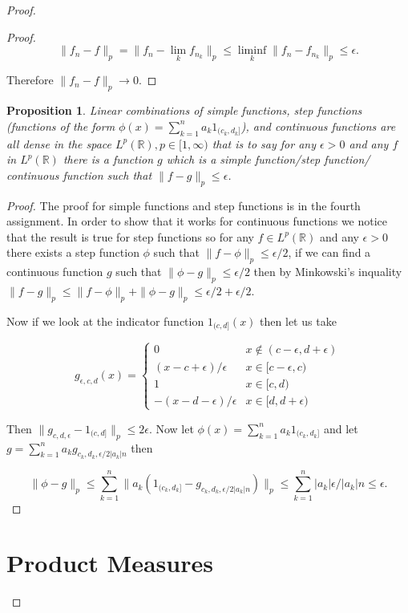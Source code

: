 \documentclass[
]{book}
\newtheorem{proposition}{Proposition}[chapter]
\theoremstyle{definition}
\theoremstyle{definition}
\theoremstyle{definition}
\theoremstyle{definition}
\theoremstyle{remark}
\begin{document}
\begin{proof}
\begin{proof}
\[ \|f_n -f\|_p = \|f_n - \lim_k f_{n_k}\|_p \leq \liminf_k \|f_n - f_{n_k}\|_p \leq \epsilon. \]

Therefore \(\|f_n - f\|_p \rightarrow 0.\)
\end{proof}

\begin{proposition}
Linear combinations of simple functions, step functions (functions of the form \(\phi(x) = \sum_{k=1}^n a_k 1_{(c_k,d_k]}\)), and continuous functions are all dense in the space \(L^p(\mathbb{R}), p \in [1,\infty)\) that is to say for any \(\epsilon > 0\) and any \(f\) in \(L^p(\mathbb{R})\) there is a function \(g\) which is a simple function/step function/ continuous function such that \(\|f-g\|_p \leq \epsilon\).
\end{proposition}

\begin{proof}
The proof for simple functions and step functions is in the fourth assignment. In order to show that it works for continuous functions we notice that the result is true for step functions so for any \(f \in L^p(\mathbb{R})\) and any \(\epsilon >0\) there exists a step function \(\phi\) such that \(\| f-\phi\|_p \leq \epsilon/2\), if we can find a continuous function \(g\) such that \(\|\phi-g\|_p \leq \epsilon/2\) then by Minkowski's inquality \(\|f-g\|_p \leq \|f-\phi\|_p + \|\phi - g\|_p \leq \epsilon/2 + \epsilon/2\).

Now if we look at the indicator function \(1_{(c,d]}(x)\) then let us take

\[ g_{\epsilon, c,d}(x) = \left\{ \begin{array}{ll} 0 & x \notin (c-\epsilon, d+\epsilon) \\ (x-c+ \epsilon)/\epsilon & x \in [c-\epsilon, c) \\ 1 & x \in [c,d) \\ -(x-d -\epsilon)/\epsilon & x \in [d, d+\epsilon) \end{array} \right. \]

Then \(\|g_{c,d,\epsilon}-1_{(c,d]}\|_p \leq 2\epsilon\). Now let \(\phi(x) = \sum_{k=1}^n a_k 1_{(c_k,d_k]}\) and let \(g = \sum_{k=1}^n a_k g_{c_k, d_k, \epsilon/2|a_k| n}\) then

\[ \| \phi - g\|_p \leq \sum_{k=1}^n \| a_k (1_{(c_k, d_k]} - g_{c_k, d_k, \epsilon/2|a_k|n})\|_p \leq \sum_{k=1}^n |a_k| \epsilon/|a_k| n \leq \epsilon.  \]
\end{proof}

\hypertarget{product-measures}{%
\chapter{Product Measures}\label{product-measures}}


\end{proof}
\end{document}
